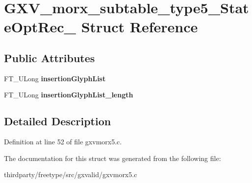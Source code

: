 \hypertarget{struct_g_x_v__morx__subtable__type5___state_opt_rec__}{}\section{G\+X\+V\+\_\+morx\+\_\+subtable\+\_\+type5\+\_\+\+State\+Opt\+Rec\+\_\+ Struct Reference}
\label{struct_g_x_v__morx__subtable__type5___state_opt_rec__}
\subsection*{Public Attributes}
\begin{DoxyCompactItemize}
\item 
\mbox{\label{struct_g_x_v__morx__subtable__type5___state_opt_rec___a3a7fee04dd37e0bb5a78cdf1e1a985a1}} 
F\+T\+\_\+\+U\+Long {\bfseries insertion\+Glyph\+List}
\item 
\mbox{\label{struct_g_x_v__morx__subtable__type5___state_opt_rec___a51a84135507a12da64b8b6d1835d4aef}} 
F\+T\+\_\+\+U\+Long {\bfseries insertion\+Glyph\+List\+\_\+length}
\end{DoxyCompactItemize}


\subsection{Detailed Description}


Definition at line 52 of file gxvmorx5.\+c.



The documentation for this struct was generated from the following file\+:\begin{DoxyCompactItemize}
\item 
thirdparty/freetype/src/gxvalid/gxvmorx5.\+c\end{DoxyCompactItemize}

